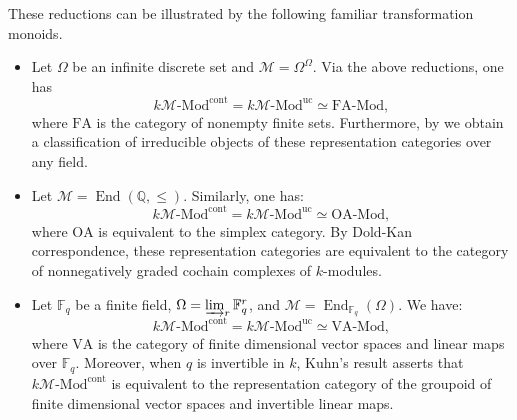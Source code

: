 \documentclass[10pt, reqno]{amsart}
\theoremstyle{plain}
\numberwithin{equation}{section}
\theoremstyle{definition}
\newcommand{\End}{\operatorname{End}}
\newcommand{\Mod}{{\textrm{-}\mathrm{Mod}}}
\newcommand{\FA}{\mathrm{FA}}
\newcommand{\M}{\mathscr M}
\begin{document}
These reductions can be illustrated by the following familiar transformation monoids.
\begin{itemize}
\item Let $\Omega$ be an infinite discrete set and $\M = \Omega^{\Omega}$. Via the above reductions, one has
    \[
    k\M \Mod^{\mathrm{cont}} = k\M \Mod^{\mathrm{uc}} \simeq \FA \Mod,
    \]
where $\FA$ is the category of nonempty finite sets. Furthermore, by \cite{LiRel} we obtain a classification of irreducible objects of these representation categories over any field.

\item Let $\M = \End(\mathbb{Q}, \leqslant)$. Similarly, one has:
    \[
    k\M\Mod^{\mathrm{cont}} = k\M\Mod^{\mathrm{uc}} \simeq \mathrm{OA} \Mod,
    \]
where $\mathrm{OA}$ is equivalent to the simplex category. By Dold-Kan correspondence, these representation categories are equivalent to the category of nonnegatively graded cochain complexes of $k$-modules.

\item Let $\mathbb{F}_q$ be a finite field, $\Omega = \varinjlim_r \mathbb{F}_q^r$, and $\M = \End_{\mathbb{F}_q} (\Omega)$. We have:
    \[
    k\M\Mod^{\mathrm{cont}} = k\M\Mod^{\mathrm{uc}} \simeq \mathrm{VA} \Mod,
    \]
where $\mathrm{VA}$ is the category of finite dimensional vector spaces and linear maps over $\mathbb{F}_q$. Moreover, when $q$ is invertible in $k$, Kuhn's result \cite{Kuhn} asserts that $k\M \Mod^{\mathrm{cont}}$ is equivalent to the representation category of the groupoid of finite dimensional vector spaces and invertible linear maps.
\end{itemize}
\end{document}
